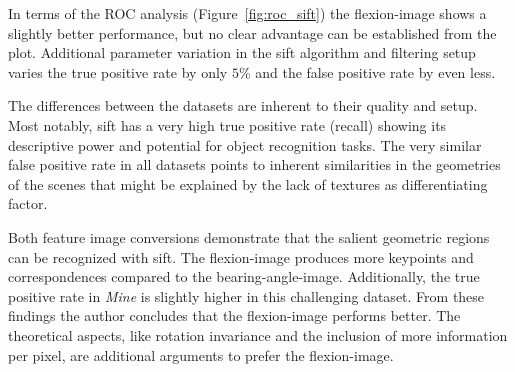 In terms of the \acrshort{ROC} analysis (Figure~\ref{fig:roc_sift}) the \gls{flexion-image} shows a slightly better performance, but no clear advantage can be established from the plot.
Additional parameter variation in the \acrshort{sift} algorithm and filtering setup varies the true positive rate by only $5\%$ and the false positive rate by even less.

The differences between the datasets are inherent to their quality and setup.
Most notably, \acrshort{sift} has a very high true positive rate (recall) showing its descriptive power and potential for object recognition tasks.
The very similar false positive rate in all datasets points to inherent similarities in the geometries of the scenes that might be explained by the lack of textures as differentiating factor.

Both feature image conversions demonstrate that the salient geometric regions can be recognized with \acrshort{sift}.
The \gls{flexion-image} produces more keypoints and correspondences compared to the \gls{bearing-angle-image}.
Additionally, the true positive rate in \emph{Mine} is slightly higher in this challenging dataset.
From these findings the author concludes that the \gls{flexion-image} performs better.
The theoretical aspects, like rotation invariance and the inclusion of more information per pixel, are additional arguments to prefer the \gls{flexion-image}.
